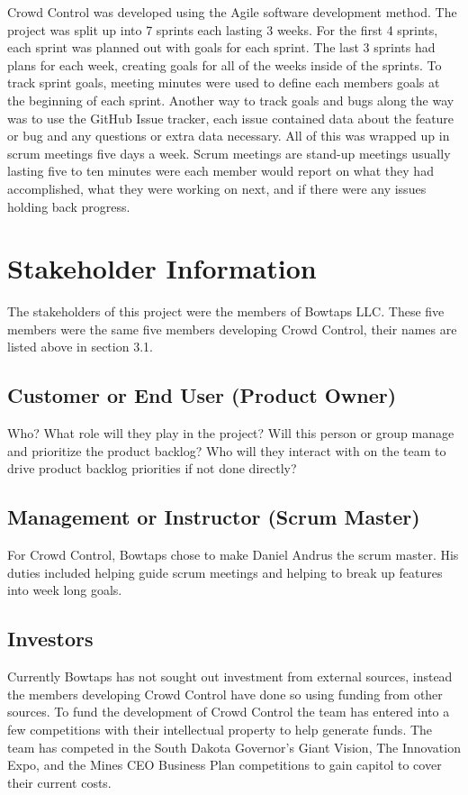 Crowd Control was developed using the Agile software development method.  The project was split up into 7 sprints each lasting 3 weeks.  For the first 4 sprints, each sprint was planned out with goals for each sprint.  The last 3 sprints had plans for each week, creating goals for all of the weeks inside of the sprints.  To track sprint goals, meeting minutes were used to define each members goals at the beginning of each sprint.  Another way to track goals and bugs along the way was to use the GitHub Issue tracker, each issue contained data about the feature or bug and any questions or extra data necessary.  All of this was wrapped up in scrum meetings five days a week.  Scrum meetings are stand-up meetings usually lasting five to ten minutes were each member would report on what they had accomplished, what they were working on next, and if there were any issues holding back progress.


\section{ Stakeholder Information}
The stakeholders of this project were the members of Bowtaps LLC.  These five members were the same five members developing Crowd Control, their names are listed above in section 3.1.


\subsection{Customer or End User (Product Owner)}
Who?  What role will they play in the project?  Will this person or group manage 
and prioritize the product backlog?  Who will they interact with on the team to 
drive product backlog priorities if not done directly? 

\subsection{Management or Instructor (Scrum Master)}
For Crowd Control, Bowtaps chose to make Daniel Andrus the scrum master. His duties included helping guide scrum meetings and helping to break up features into week long goals.


\subsection{Investors}
Currently Bowtaps has not sought out investment from external sources, instead the members developing Crowd Control have done so using funding from other sources.  To fund the development of Crowd Control the team has entered into a few competitions with their intellectual property to help generate funds.   The team has competed in the South Dakota Governor's Giant Vision, The Innovation Expo, and the Mines CEO Business Plan competitions to gain capitol to cover their current costs.


